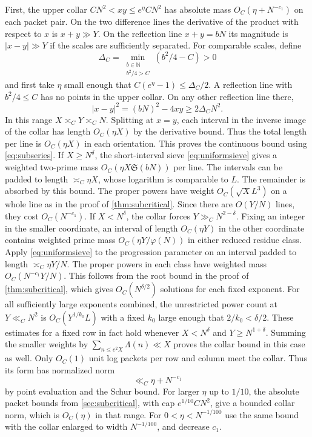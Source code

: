 \documentclass[11pt,a4paper]{article}
\numberwithin{equation}{section}
\newcommand{\SSS}{\mathfrak S}
\begin{document}
First, the upper collar $CN^2<xy\le e^\eta CN^2$ has absolute
mass $O_C(\eta+N^{-c_1})$ on each packet pair. On the two
difference lines the derivative of the product with respect
to $x$ is $x+y\gg Y$. On the reflection line $x+y=bN$ its
magnitude is $|x-y|\gg Y$ if the scales are sufficiently
separated. For comparable scales, define
\[
 \Delta_C=\min_{\substack{b\in\mathbb N\\ b^2/4>C}}(b^2/4-C)>0
\]
and first take $\eta$ small enough that
$C(e^\eta-1)\le\Delta_C/2$. A reflection line with
$b^2/4\le C$ has no points in the upper collar. On any other
reflection line there,
\[
 |x-y|^2=(bN)^2-4xy\ge 2\Delta_C N^2.
\]
In this range $X\asymp_C Y\asymp_C N$. Splitting at $x=y$,
each interval in the inverse image of the collar has length
$O_C(\eta X)$ by the derivative bound. Thus the total length
per line is $O_C(\eta X)$ in each orientation.
This proves the continuous bound using
\cref{eq:subseries}. If $X\ge N^\delta$, the short-interval
sieve \eqref{eq:uniformsieve} gives a weighted two-prime
mass $O_C(\eta X\SSS(bN))$ per line. The intervals
can be padded to length $\asymp_C\eta X$, whose
logarithm is comparable to $L$. The remainder is absorbed
by this bound. The proper powers have weight $O_C(\sqrt X L^3)$
on a whole line as in the proof of \cref{thm:subcritical}.
Since there are $O(Y/N)$ lines, they cost $O_C(N^{-c_1})$.
If $X<N^\delta$, the collar forces $Y\gg_C N^{2-\delta}$.
Fixing an integer in the smaller coordinate, an interval of
length $O_C(\eta Y)$ in the other coordinate contains
weighted prime mass $O_C(\eta Y/\varphi(N))$ in either
reduced residue class. Apply \eqref{eq:uniformsieve} to the
progression parameter on an interval padded to length
$\asymp_C\eta Y/N$. The proper powers in each class have
weighted mass $O_C(N^{-c_1}Y/N)$. This follows from the
root bound in the proof of \cref{thm:subcritical}, which
gives $O_C(N^{\delta/2})$ solutions for each fixed exponent.
For all sufficiently large exponents combined, the unrestricted
power count at $Y\ll_C N^2$ is $O_C(Y^{1/k_0} L)$ with a
fixed $k_0$ large enough that $2/k_0<\delta/2$.
These estimates for a fixed row in fact hold whenever
$X<N^\delta$ and $Y\ge N^{1+\delta}$. Summing the smaller
weights by $\sum_{n\le e^2 X}\Lambda(n)\ll X$ proves the
collar bound in this case as well.
Only $O_C(1)$ unit log packets per row and column meet the
collar. Thus its form has normalized norm
\begin{equation}
 \ll_C \eta+N^{-c_1}
 \label{eq:criticalcollar}
\end{equation}
by point evaluation and the Schur bound. For larger $\eta$
up to $1/10$, the absolute packet bounds from
\cref{sec:subcritical}, with cap $e^{1/10}CN^2$, give a
bounded collar norm, which is $O_C(\eta)$ in that range.
For $0<\eta<N^{-1/100}$ use the same bound with the collar
enlarged to width $N^{-1/100}$, and decrease $c_1$.
\end{document}
